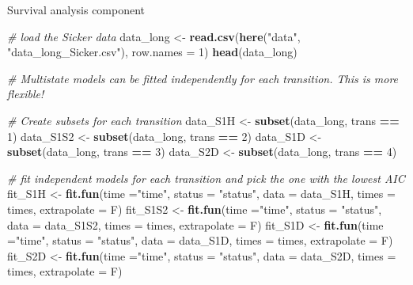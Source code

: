 \documentclass[
]{article}
\newenvironment{Shaded}{\begin{snugshade}}{\end{snugshade}}
\newcommand{\CommentTok}[1]{\textcolor[rgb]{0.56,0.35,0.01}{\textit{#1}}}
\newcommand{\DataTypeTok}[1]{\textcolor[rgb]{0.13,0.29,0.53}{#1}}
\newcommand{\DecValTok}[1]{\textcolor[rgb]{0.00,0.00,0.81}{#1}}
\newcommand{\KeywordTok}[1]{\textcolor[rgb]{0.13,0.29,0.53}{\textbf{#1}}}
\newcommand{\NormalTok}[1]{#1}
\newcommand{\OperatorTok}[1]{\textcolor[rgb]{0.81,0.36,0.00}{\textbf{#1}}}
\newcommand{\StringTok}[1]{\textcolor[rgb]{0.31,0.60,0.02}{#1}}
\begin{document}
Survival analysis component

\begin{Shaded}
\begin{Highlighting}[]
\CommentTok{# load the Sicker data }
\NormalTok{data_long <-}\StringTok{ }\KeywordTok{read.csv}\NormalTok{(}\KeywordTok{here}\NormalTok{(}\StringTok{"data"}\NormalTok{, }\StringTok{"data_long_Sicker.csv"}\NormalTok{), }\DataTypeTok{row.names =} \DecValTok{1}\NormalTok{)}
\KeywordTok{head}\NormalTok{(data_long)}

\CommentTok{# Multistate models can be fitted independently for each transition. This is more flexible!}

\CommentTok{# Create subsets for each transition}
\NormalTok{data_S1H  <-}\StringTok{ }\KeywordTok{subset}\NormalTok{(data_long, trans }\OperatorTok{==}\StringTok{ }\DecValTok{1}\NormalTok{)}
\NormalTok{data_S1S2 <-}\StringTok{ }\KeywordTok{subset}\NormalTok{(data_long, trans }\OperatorTok{==}\StringTok{ }\DecValTok{2}\NormalTok{)}
\NormalTok{data_S1D  <-}\StringTok{ }\KeywordTok{subset}\NormalTok{(data_long, trans }\OperatorTok{==}\StringTok{ }\DecValTok{3}\NormalTok{)}
\NormalTok{data_S2D  <-}\StringTok{ }\KeywordTok{subset}\NormalTok{(data_long, trans }\OperatorTok{==}\StringTok{ }\DecValTok{4}\NormalTok{)}

\CommentTok{# fit independent models for each transition and pick the one with the lowest AIC}
\NormalTok{fit_S1H  <-}\StringTok{ }\KeywordTok{fit.fun}\NormalTok{(}\DataTypeTok{time =}\StringTok{"time"}\NormalTok{, }\DataTypeTok{status =} \StringTok{"status"}\NormalTok{, }\DataTypeTok{data =}\NormalTok{ data_S1H, }\DataTypeTok{times =}\NormalTok{ times, }
                    \DataTypeTok{extrapolate =}\NormalTok{ F)}
\NormalTok{fit_S1S2 <-}\StringTok{ }\KeywordTok{fit.fun}\NormalTok{(}\DataTypeTok{time =}\StringTok{"time"}\NormalTok{, }\DataTypeTok{status =} \StringTok{"status"}\NormalTok{, }\DataTypeTok{data =}\NormalTok{ data_S1S2, }\DataTypeTok{times =}\NormalTok{ times, }
                    \DataTypeTok{extrapolate =}\NormalTok{ F)}
\NormalTok{fit_S1D  <-}\StringTok{ }\KeywordTok{fit.fun}\NormalTok{(}\DataTypeTok{time =}\StringTok{"time"}\NormalTok{, }\DataTypeTok{status =} \StringTok{"status"}\NormalTok{, }\DataTypeTok{data =}\NormalTok{ data_S1D, }\DataTypeTok{times =}\NormalTok{ times, }
                    \DataTypeTok{extrapolate =}\NormalTok{ F)}
\NormalTok{fit_S2D  <-}\StringTok{ }\KeywordTok{fit.fun}\NormalTok{(}\DataTypeTok{time =}\StringTok{"time"}\NormalTok{, }\DataTypeTok{status =} \StringTok{"status"}\NormalTok{, }\DataTypeTok{data =}\NormalTok{ data_S2D, }\DataTypeTok{times =}\NormalTok{ times, }
                    \DataTypeTok{extrapolate =}\NormalTok{ F)}


\end{Highlighting}
\end{Shaded}
\end{document}
